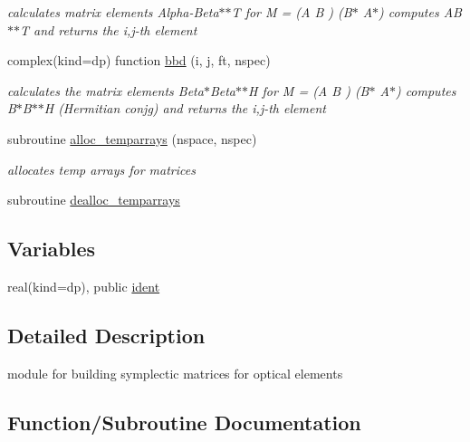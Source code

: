 \begin{DoxyCompactItemize}
\begin{DoxyCompactList}\small\item\em calculates matrix elements Alpha-\/\+Beta$\ast$$\ast$T  for M = (A B ) (B$\ast$ A$\ast$) computes A\+B$\ast$$\ast$T and returns the i,j-\/th element \end{DoxyCompactList}\item 
complex(kind=dp) function \hyperlink{namespacemakeopticalelements_a7d0e54a1c7f830fd961f3c99d0a49b30}{bbd} (i, j, ft, nspec)
\begin{DoxyCompactList}\small\item\em calculates the matrix elements Beta$\ast$\+Beta$\ast$$\ast$H  for M = (A B ) (B$\ast$ A$\ast$) computes B$\ast$\+B$\ast$$\ast$H (Hermitian conjg) and returns the i,j-\/th element \end{DoxyCompactList}\item 
subroutine \hyperlink{namespacemakeopticalelements_aefda61530c80eccf75e7065015af413d}{alloc\+\_\+temparrays} (nspace, nspec)
\begin{DoxyCompactList}\small\item\em allocates temp arrays for matrices \end{DoxyCompactList}\item 
subroutine \hyperlink{namespacemakeopticalelements_aab212aad9e53b7ae643456f9bc0b68cb}{dealloc\+\_\+temparrays}
\end{DoxyCompactItemize}
\subsection*{Variables}
\begin{DoxyCompactItemize}
\item 
real(kind=dp), public \hyperlink{namespacemakeopticalelements_ab4e48a98a0fb0756bb4eff6ece9623a8}{ident}
\end{DoxyCompactItemize}


\subsection{Detailed Description}
module for building symplectic matrices for optical elements 

\subsection{Function/\+Subroutine Documentation}
\mbox{\label{namespacemakeopticalelements_a1b408449683f6bcc96ee25d4bbc1aa8b}} 
